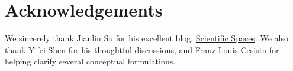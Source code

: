 \section*{Acknowledgements}

We sincerely thank Jianlin Su for his excellent blog, \href{https://kexue.fm}{Scientific Spaces}. We also thank Yifei Shen for his thoughtful discussions, and Franz Louis Cesista for helping clarify several conceptual formulations.
